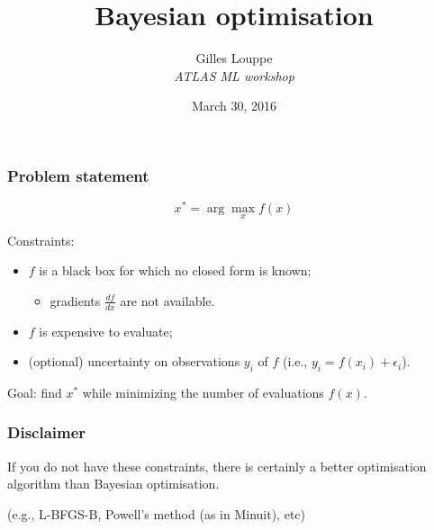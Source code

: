 \documentclass{beamer}
\title{{\bf Bayesian optimisation}}
\author{
Gilles Louppe\\
{\it ATLAS ML workshop}
}
\date{March 30, 2016}
\begin{document}
\begin{frame}[plain]
\titlepage
\end{frame}

\begin{frame}
    \frametitle{Problem statement}

    \begin{center}
        $$x^* = \arg \max_x f(x)$$
    \end{center}

    \vspace{2em}

    Constraints:
    \begin{itemize}
        \item $f$ is a black box for which no closed form is known;
            \begin{itemize}
                \item gradients $\frac{df}{dx}$ are not available.
            \end{itemize}

        \item $f$ is expensive to evaluate;

        \item (optional) uncertainty on observations $y_i$ of $f$ (i.e., $y_i = f(x_i) + \epsilon_i$).
    \end{itemize}

    \vspace{2em}

    Goal: find $x^*$ while minimizing the number of evaluations $f(x)$.
\end{frame}

\begin{frame}
    \frametitle{\color{red} Disclaimer}
    \begin{center}
        If you do not have these constraints, there is certainly a better optimisation algorithm than Bayesian optimisation.

        \vspace{3em}

        (e.g., L-BFGS-B, Powell's method (as in Minuit), etc)
    \end{center}
\end{frame}
\end{document}
